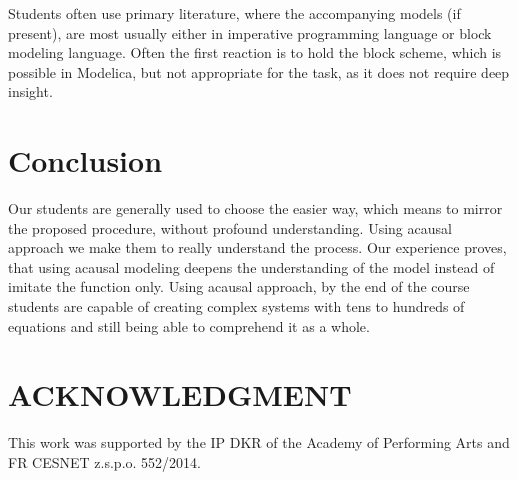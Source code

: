 \documentclass[letterpaper, 10 pt, conference]{ieeeconf}  %
\begin{document}
Students often use primary literature, where the accompanying models (if present), are most usually either in imperative programming language or block modeling language. Often the first reaction is to hold the block scheme, which is possible in Modelica, but not appropriate for the task, as it does not require deep insight. %





\section{Conclusion}

Our students are generally used to choose the easier way, which means to mirror the proposed procedure, without profound understanding. Using acausal approach we make them to really understand the process. Our experience proves, that using acausal modeling deepens the understanding of the model instead of imitate the function only. Using acausal approach, by the end of the course students are capable of creating complex systems with tens to hundreds of equations and still being able to comprehend it as a whole. 



\section*{ACKNOWLEDGMENT}

This work was supported by the IP DKR of the Academy of Performing Arts and FR CESNET z.s.p.o. 552/2014.



\end{document}
